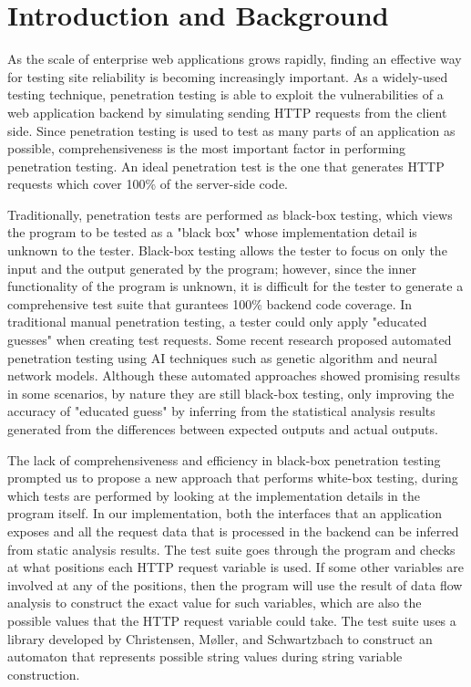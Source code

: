 \chapter{Introduction and Background}

As the scale of enterprise web applications grows rapidly, finding an effective way for testing site reliability is becoming increasingly important. As a widely-used testing technique, penetration testing is able to exploit the vulnerabilities of a web application backend by simulating sending HTTP requests from the client side. Since penetration testing is used to test as many parts of an application as possible, comprehensiveness is the most important factor in performing penetration testing. An ideal penetration test is the one that generates HTTP requests which cover 100\% of the server-side code.

Traditionally, penetration tests are performed as black-box testing, which views the program to be tested as a "black box" whose implementation detail is unknown to the tester. Black-box testing allows the tester to focus on only the input and the output generated by the program; however, since the inner functionality of the program is unknown, it is difficult for the tester to generate a comprehensive test suite that gurantees 100\% backend code coverage. In traditional manual penetration testing, a tester could only apply "educated guesses" when creating test requests. Some recent research proposed automated penetration testing using AI techniques such as genetic algorithm and neural network models. Although these automated approaches showed promising results in some scenarios, by nature they are still black-box testing, only improving the accuracy of "educated guess" by inferring from the statistical analysis results generated from the differences between expected outputs and actual outputs.

The lack of comprehensiveness and efficiency in black-box penetration testing prompted us to propose a new approach that performs white-box testing, during which tests are performed by looking at the implementation details in the program itself. In our implementation, both the interfaces that an application exposes and all the request data that is processed in the backend can be inferred from static analysis results. The test suite goes through the program and checks at what positions each HTTP request variable is used. If some other variables are involved at any of the positions, then the program will use the result of data flow analysis to construct the exact value for such variables, which are also the possible values that the HTTP request variable could take. The test suite uses a library developed by Christensen, Møller, and Schwartzbach \cite{ref1} to construct an automaton that represents possible string values during string variable construction.

